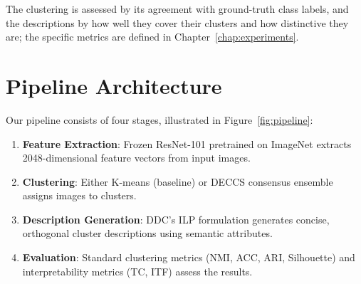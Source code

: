 The clustering is assessed by its agreement with ground-truth class labels, and the descriptions by how well they cover their clusters and how distinctive they are; the specific metrics are defined in Chapter~\ref{chap:experiments}.

\section{Pipeline Architecture}

Our pipeline consists of four stages, illustrated in Figure~\ref{fig:pipeline}:

\begin{enumerate}
    \item \textbf{Feature Extraction}: Frozen ResNet-101 pretrained on ImageNet extracts 2048-dimensional feature vectors from input images.
    \item \textbf{Clustering}: Either K-means (baseline) or DECCS consensus ensemble assigns images to clusters.
    \item \textbf{Description Generation}: DDC's ILP formulation generates concise, orthogonal cluster descriptions using semantic attributes.
    \item \textbf{Evaluation}: Standard clustering metrics (NMI, ACC, ARI, Silhouette) and interpretability metrics (TC, ITF) assess the results.
\end{enumerate}

